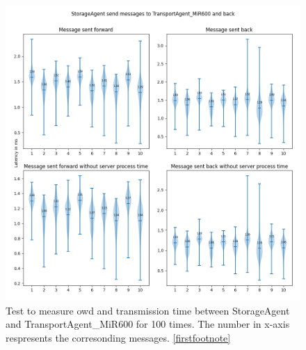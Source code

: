 \begin{figure}[p]
    \includegraphics[width=\textwidth]{figures/appendix/usecase/violin_StorageAgent_to_TransportAgent_MiR600.png}
    \centering
    \caption{Test to measure \gls{owd} and transmission time between StorageAgent and 
    TransportAgent\_MiR600 for 100 times. The number in x-axis respresents the 
    corresonding messages. \protect\ref{firstfootnote}}
    \label{fig: violin-ST-T600}
\end{figure}

